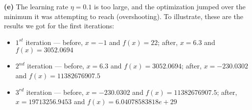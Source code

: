 \documentclass[leqno]{article}
\begin{document}
\hfill

\noindent \textbf{(e)} The learning rate $\eta = 0.1$ is too large, and the optimization jumped over the minimum it was attempting to reach (overshooting). To
illustrate, these are the results we got for the first iterations:
\begin{itemize}
\item $1^{st}$ iteration --- before, $x = -1$ and $f(x) = 22$; after, $x = 6.3$ and $f(x) = 3052.0694$
\item $2^{nd}$ iteration --- before, $x = 6.3$ and $f(x) = 3052.0694$; after, $x = -230.0302$ and $f(x) = 11382676907.5$
\item $3^{rd}$ iteration --- before, $x = -230.0302$ and $f(x) = 11382676907.5$; after, $x = 19713256.9453$ and $f(x) = 6.04078583818e+29$
\end{itemize}  
\end{document}
